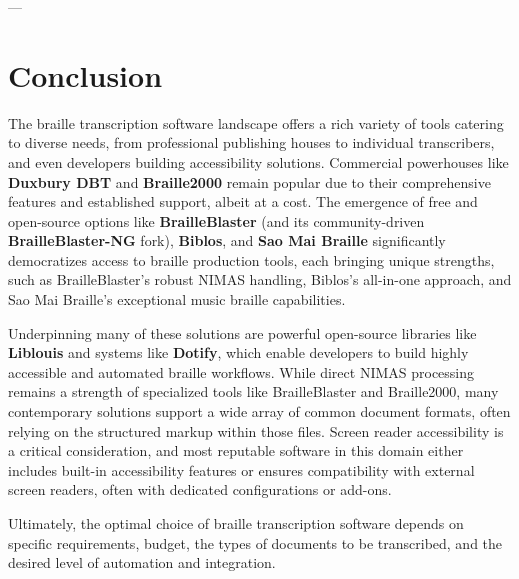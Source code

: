 ---

\section{Conclusion}
\label{sec:braille-conclusion}
The braille transcription software landscape offers a rich variety of tools catering to diverse needs, from professional publishing houses to individual transcribers, and even developers building accessibility solutions. Commercial powerhouses like \textbf{Duxbury DBT} and \textbf{Braille2000} remain popular due to their comprehensive features and established support, albeit at a cost. The emergence of free and open-source options like \textbf{BrailleBlaster} (and its community-driven \textbf{BrailleBlaster-NG} fork), \textbf{Biblos}, and \textbf{Sao Mai Braille} significantly democratizes access to braille production tools, each bringing unique strengths, such as BrailleBlaster's robust NIMAS handling, Biblos's all-in-one approach, and Sao Mai Braille's exceptional music braille capabilities.

Underpinning many of these solutions are powerful open-source libraries like \textbf{Liblouis} and systems like \textbf{Dotify}, which enable developers to build highly accessible and automated braille workflows. While direct NIMAS processing remains a strength of specialized tools like BrailleBlaster and Braille2000, many contemporary solutions support a wide array of common document formats, often relying on the structured markup within those files. Screen reader accessibility is a critical consideration, and most reputable software in this domain either includes built-in accessibility features or ensures compatibility with external screen readers, often with dedicated configurations or add-ons.

Ultimately, the optimal choice of braille transcription software depends on specific requirements, budget, the types of documents to be transcribed, and the desired level of automation and integration.
